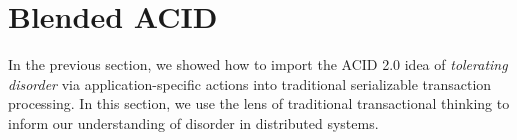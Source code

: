 \documentclass{sig-alternate}
\newcommand{\jmh}[1]{{\textcolor{red}{#1 -- jmh}}}
\begin{document}
\begin{comment}
As an example, consider the classic case of debit/credit ledgers.  We begin with
the simple case in which all actions are credits. We assume that an account is
liquid if its balance is above zero. In Bloom's lattice notation~\cite{Conway2012},
this looks like so:
\begin{quote}
  \jmh{`ledger' is an lmap with key `acctId' and value an lset of [xid, amount]
    pairs.  `balance' is a derived lmap with key `acctId' and an lmax `value'.
    `liquid' is an lmap from `acctId' to an lbool `status'.  The monotone
    function sum maps from [xid,amount] to `value', and the monotone function gt
    maps from `value' to `status'. Need to give syntax and explanation, perhaps
    in a figure if its too big a gulp inline.  I fudged: ledger is not a
    sequence, it's a set.  That's OK for the credit-only scenario, but kinda
    bogus.}
\end{quote}
In a credit-only scenario, the ledger grows monotonically as a set of credits,
the account balances grow monotonically as integers, and account liquidity grows
monotonically as a boolean (from false to true).  However, consider introducing
debits that succeed only if the account would remain liquid: ``conflicts'' can
arise between the liquidity checks of debits and credits, so we must establish
ordering constraints for each debit with respect to preceding credits.  However,
the order among credits remains irrelevant---the only order that matters relates
to the non-monotone operator `debit'.  In Bloom, this non-monotonicity is again
clear from the syntax and checkable by a parser:
\begin{quote}
	\jmh{debit logic including threshold test goes here}
\end{quote}
Note that we can be finer-grained in our assessment of conflict: there are no
conflicts across acctIds, which can be determined via analyzing the program
logic: the grouping of balance by acctID \emph{partitions} the ledger.  This
partitioning is akin to the partitioning of Reads and Writes, which conflict
only if they are on the same object.
\end{comment}

\section{Blended ACID}
In the previous section, we showed how to import the ACID 2.0 idea of
\emph{tolerating disorder} via application-specific actions into traditional
serializable transaction processing. In this section, we use the lens of
traditional transactional thinking to inform our understanding of disorder in
distributed systems.
\end{document}
